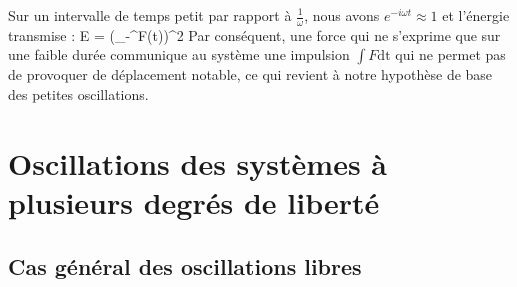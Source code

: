 Sur un intervalle de temps petit par rapport \`a $\frac{1}{\omega}$, nous avons $e^{-i\omega t} \approx 1$ et l'\'energie transmise :
\benn
	E =  \left(\int_{-\infty}^{\infty}{F(t)}\right)^{2}
\eenn
Par cons\'equent, une force qui ne s'exprime que sur une faible dur\'ee communique au syst\`eme une impulsion $\int F\mathrm{dt}$ qui ne permet pas de provoquer de d\'eplacement notable, ce qui revient \`a notre hypoth\`ese de base des petites oscillations.

\section{Oscillations des syst\`emes \`a plusieurs degr\'es de libert\'e}\label{PAR:23}

\subsection{Cas g\'en\'eral des oscillations libres}

